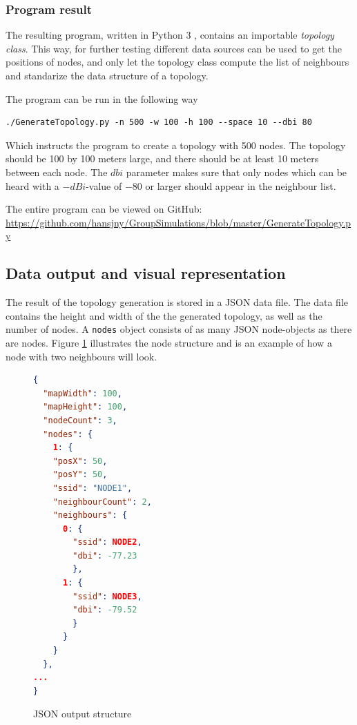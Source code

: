 	\subsubsection{Program result}
	The resulting program, written in Python 3 \cite{Python3}, contains an importable \textit{topology class}. This way, for further testing different data
	sources can be used to get the positions of nodes, and only let the topology class compute the list of neighbours and standarize the data structure of a topology.

The program can be run in the following way
\begin{verbatim}./GenerateTopology.py -n 500 -w 100 -h 100 --space 10 --dbi 80 \end{verbatim}
Which instructs the program to create a topology with 500 nodes. The topology should be 100 by 100 meters large, and there should be at least 10 meters
between each node. The $dbi$ parameter makes sure that only nodes which can be heard with a $-dBi$-value of $-80$ or larger should appear in the neighbour list. 

The entire program can be viewed on GitHub: \newline
{\small \url{https://github.com/hansjny/GroupSimulations/blob/master/GenerateTopology.py}}


\subsection{Data output and visual representation} \label{simulationrep}
The result of the topology generation is stored in a JSON \cite{JSON} data file.
The data file contains the height and width of the the generated topology, as well
as the number of nodes.
A \verb|nodes| object consists of as many JSON node-objects as there are nodes. Figure \ref{fig:nodeStruct} illustrates the node structure and is an example of how a node with two neighbours will look.
			\begin{figure}
			\begin{minipage}{\linewidth}
			\begin{lstlisting}[language=json]
{
  "mapWidth": 100,
  "mapHeight": 100,
  "nodeCount": 3,
  "nodes": {
    1: {
    "posX": 50,
    "posY": 50, 
    "ssid": "NODE1", 
    "neighbourCount": 2, 
    "neighbours": {
      0: {
        "ssid": NODE2,
        "dbi": -77.23
        },
      1: {
        "ssid": NODE3,
        "dbi": -79.52
        }
      }
    }
  },
...
}
\end{lstlisting}
\end{minipage}
\caption{JSON output structure}
\label{fig:nodeStruct}

\end{figure}

